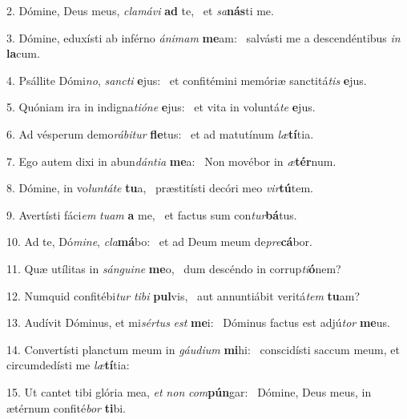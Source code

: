 2. Dómine, Deus meus, \textit{cla}\textit{má}\textit{vi} \textbf{ad} te, \ast\  et \textit{sa}\textbf{nás}ti me.\

3. Dómine, eduxísti ab inférno \textit{á}\textit{ni}\textit{mam} \textbf{me}am: \ast\  salvásti me a descendéntibus \textit{in} \textbf{la}cum.\

4. Psállite Dómi\textit{no}, \textit{sanc}\textit{ti} \textbf{e}jus: \ast\  et confitémini memóriæ sanctitá\textit{tis} \textbf{e}jus.\

5. Quóniam ira in indigna\textit{ti}\textit{ó}\textit{ne} \textbf{e}jus: \ast\  et vita in voluntá\textit{te} \textbf{e}jus.\

6. Ad vésperum demo\textit{rá}\textit{bi}\textit{tur} \textbf{fle}tus: \ast\  et ad matutínum \textit{læ}\textbf{tí}tia.\

7. Ego autem dixi in abun\textit{dán}\textit{ti}\textit{a} \textbf{me}a: \ast\  Non movébor in \textit{æ}\textbf{tér}num.\

8. Dómine, in vo\textit{lun}\textit{tá}\textit{te} \textbf{tu}a, \ast\  præstitísti decóri meo \textit{vir}\textbf{tú}tem.\

9. Avertísti fáci\textit{em} \textit{tu}\textit{am} \textbf{a} me, \ast\  et factus sum con\textit{tur}\textbf{bá}tus.\

10. Ad te, Dó\textit{mi}\textit{ne}, \textit{cla}\textbf{má}bo: \ast\  et ad Deum meum de\textit{pre}\textbf{cá}bor.\

11. Quæ utílitas in \textit{sán}\textit{gui}\textit{ne} \textbf{me}o, \ast\  dum descéndo in corrup\textit{ti}\textbf{ó}nem?\

12. Numquid confitébi\textit{tur} \textit{ti}\textit{bi} \textbf{pul}vis, \ast\  aut annuntiábit veritá\textit{tem} \textbf{tu}am?\

13. Audívit Dóminus, et mi\textit{sér}\textit{tus} \textit{est} \textbf{me}i: \ast\  Dóminus factus est adjú\textit{tor} \textbf{me}us.\

14. Convertísti planctum meum in \textit{gáu}\textit{di}\textit{um} \textbf{mi}hi: \ast\  conscidísti saccum meum, et circumdedísti me \textit{læ}\textbf{tí}tia:\

15. Ut cantet tibi glória mea, \textit{et} \textit{non} \textit{com}\textbf{pún}gar: \ast\  Dómine, Deus meus, in ætérnum confité\textit{bor} \textbf{ti}bi.\

